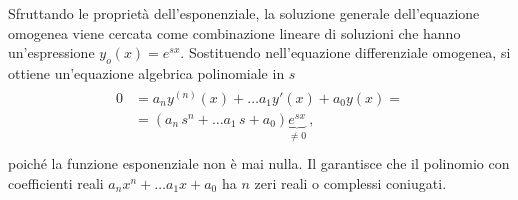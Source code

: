 \documentclass[letterpaper,10pt,italian]{jupyterBook}
\begin{document}
\sphinxAtStartPar
Sfruttando le proprietà dell’esponenziale, la soluzione generale dell’equazione omogenea viene cercata come combinazione lineare di soluzioni che hanno un’espressione \(y_o(x) = e^{s x}\). Sostituendo nell’equazione differenziale omogenea, si ottiene un’equazione algebrica polinomiale in \(s\)
\begin{equation*}
\begin{split}\begin{aligned}
  0 & = a_n y^{(n)}(x) + \dots a_1 y'(x) + a_0 y(x) = \\
    & = \left( a_n \, s^n + \dots a_1 \, s + a_0 \right) \underbrace{e^{s x}}_{\ne 0} \ , \\
\end{aligned}\end{split}
\end{equation*}
\sphinxAtStartPar
poiché la funzione esponenziale non è mai nulla. Il {\hyperref[\detokenize{ch/precalculus/polynomials:math-hs-precalculus-polynomials-alg-fund-thm-real-coeffs}]{}} garantisce che il polinomio con coefficienti reali \(a_n x^n + \dots a_1 x + a_0\) ha \(n\) zeri reali o complessi coniugati.
\end{document}
